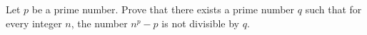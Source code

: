 Let $p$ be a prime number. Prove that there exists a prime number $q$ such that for every integer $n$, the number $n^p - p$ is not divisible by $q$.
